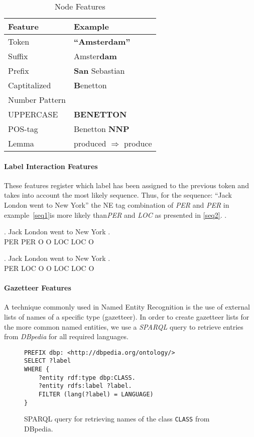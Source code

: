 \documentclass[11pt]{article}
\begin{document}
\begin{table}[h!]
\begin{tabular}{| l | l |}
\hline
\bf Feature & \bf Example \\
\hline
Token &  \textbf{``Amsterdam''}\\
Suffix& Amster\textbf{dam}\\
Prefix&  \textbf{San} Sebastian\\
Captitalized& \textbf{B}enetton\\
Number Pattern & \\
UPPERCASE &  \textbf{BENETTON}\\
POS-tag &  Benetton \textbf{NNP}   \\
Lemma &  produced $\Rightarrow$ produce \\
\hline
\end{tabular}
\caption{Node Features}
\label{table:node}
\end{table}

\paragraph*{Label Interaction Features}
These features register which label has been assigned to the previous token and takes into account the most likely sequence. 
Thus, for the sequence: ``Jack London went to New York'' the NE tag combination of \emph{PER} and \emph{PER} in example~\ref{seq1}is more likely 
than\emph{PER} and \emph{LOC} as presented in \ref{seq2}.
.

\exg. Jack London went to New York .\\
      PER   PER   O    O  LOC LOC  O \\\label{seq1}

\exg. Jack London went to New York . \\ 
      PER  LOC    O    O  LOC LOC O \\\label{seq2}
    

\paragraph*{Gazetteer Features}
A technique commonly used in Named Entity Recognition is the use of external lists of names of a specific type (gazetteer). 
In order to create gazetteer lists for the more common named entities, we use a \emph{SPARQL} query to retrieve entries from \emph{DBpedia} for all required languages.

\begin{figure}
\begin{verbatim}
PREFIX dbp: <http://dbpedia.org/ontology/>
SELECT ?label
WHERE {
    ?entity rdf:type dbp:CLASS.
    ?entity rdfs:label ?label.
    FILTER (lang(?label) = LANGUAGE)
}
\end{verbatim}
\caption{SPARQL query for retrieving names of the class \texttt{CLASS} from DBpedia.}
\end{figure}
\end{document}
